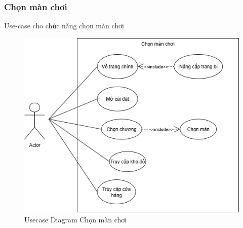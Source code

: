\subsubsection{Chọn màn chơi}
Use-case cho chức năng chọn màn chơi
\begin{figure}[H]
	\centering
	\includegraphics[width=14cm]{Images/LevelChooseUCD.png}
	\vspace{0.5cm}
	\caption{Usecase Diagram Chọn màn chơi}
\end{figure}

